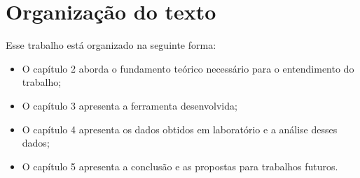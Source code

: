 \section{Organização do texto}

Esse trabalho está organizado na seguinte forma:

\begin{itemize}
\item O capítulo 2 aborda o fundamento teórico necessário para o entendimento do trabalho;
\item O capítulo 3 apresenta a ferramenta desenvolvida;
\item O capítulo 4 apresenta os dados obtidos em laboratório e a análise desses dados;
\item O capítulo 5 apresenta a conclusão e as propostas para trabalhos futuros.
\end{itemize}




